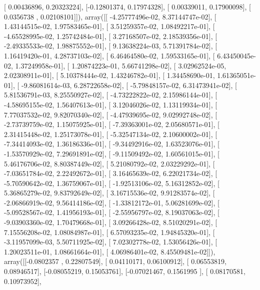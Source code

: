 \documentclass{article}
\begin{document}
       [ 0.00436896,  0.20323224],
       [-0.12801374,  0.17974328],
       [ 0.00339011,  0.17900098],
       [ 0.0356738 ,  0.02108101]]), array([[ -4.25777496e-02,   8.37144747e-02],
       [  1.43144515e-02,   1.97583465e-01],
       [  3.51259357e-02,   1.08492217e-01],
       [ -4.65528995e-02,   1.25742484e-01],
       [  3.27168507e-02,   2.18539356e-01],
       [ -2.49335533e-02,   1.98875552e-01],
       [  9.13638224e-03,   5.71391784e-02],
       [  1.16419420e-01,   4.28737103e-02],
       [  6.46464580e-02,   1.59533165e-01],
       [  6.43450045e-02,   1.37249958e-01],
       [  1.20874223e-01,   5.66741298e-02],
       [  3.02962524e-05,   2.02308911e-01],
       [  5.10378444e-02,   1.43246782e-01],
       [  1.34458690e-01,   1.61365051e-01],
       [ -9.86081614e-03,   6.28722658e-02],
       [ -5.79848157e-02,   6.31473941e-02],
       [  5.81536791e-03,   8.25550927e-02],
       [ -4.73222822e-02,   2.15986144e-01],
       [ -4.58695155e-02,   1.56407613e-01],
       [  3.12046026e-02,   1.13119934e-01],
       [  7.77037532e-02,   9.82070340e-02],
       [ -4.47939695e-02,   9.02992748e-02],
       [ -2.73739759e-02,   1.15075925e-01],
       [ -7.39363001e-02,   2.05680571e-01],
       [  2.31415448e-02,   1.25173078e-01],
       [ -5.32547134e-02,   2.10600002e-01],
       [ -7.34414093e-02,   1.36186336e-01],
       [ -9.34492916e-02,   1.63523076e-01],
       [ -1.53570929e-02,   7.29691891e-02],
       [ -9.11509492e-02,   1.60561015e-01],
       [  5.46176706e-02,   8.80387449e-02],
       [  5.21080792e-02,   2.03229292e-01],
       [ -7.03651784e-02,   2.22492672e-01],
       [  3.16465639e-02,   6.22021734e-02],
       [ -5.70590642e-02,   1.36759067e-01],
       [ -1.92513106e-02,   5.16312852e-02],
       [  5.36865279e-02,   9.83792649e-02],
       [  3.16715536e-02,   9.91283574e-02],
       [ -2.06866919e-02,   9.56414186e-02],
       [ -1.33812172e-01,   5.06281699e-02],
       [ -5.09528567e-02,   1.41956193e-01],
       [ -2.55956797e-02,   8.19037063e-02],
       [ -9.03903360e-02,   1.70479668e-01],
       [  3.09266428e-02,   8.51020291e-02],
       [  7.15556208e-02,   1.08084987e-01],
       [  6.57093235e-02,   1.94845320e-01],
       [ -3.11957099e-03,   5.50711925e-02],
       [  7.02302778e-02,   1.53056426e-01],
       [  1.20023511e-01,   1.08661664e-01],
       [  4.06986401e-02,   8.45509481e-02]]), array([[-0.0802357 ,  0.22807549],
       [ 0.04110171,  0.06100912],
       [ 0.06553819,  0.08946517],
       [-0.08055219,  0.15053761],
       [-0.07021467,  0.1561995 ],
       [ 0.08170581,  0.10973952],
\end{document}
